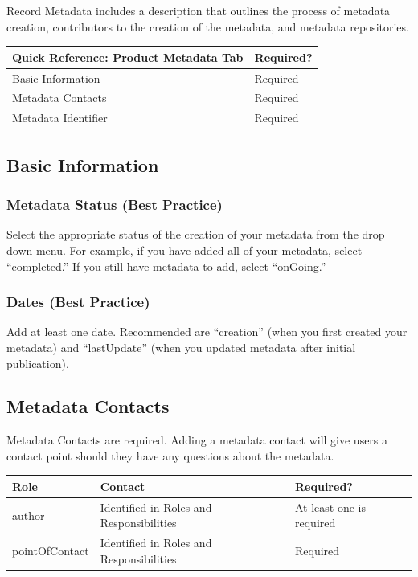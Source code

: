\documentclass[
]{book}
\begin{document}
Record Metadata includes a description that outlines the process of metadata creation, contributors to the creation of the metadata, and metadata repositories.

\begin{longtable}[]{@{}ll@{}}
\toprule
Quick Reference: Product Metadata Tab & Required?\tabularnewline
\midrule
\endhead
Basic Information & Required\tabularnewline
Metadata Contacts & Required\tabularnewline
Metadata Identifier & Required\tabularnewline
\bottomrule
\end{longtable}

\hypertarget{basic-information-3}{%
\subsection{Basic Information}\label{basic-information-3}}

\hypertarget{metadata-status-best-practice-1}{%
\subsubsection{Metadata Status (Best Practice)}\label{metadata-status-best-practice-1}}

Select the appropriate status of the creation of your metadata from the drop down menu. For example, if you have added all of your metadata, select ``completed.'' If you still have metadata to add, select ``onGoing.''

\hypertarget{dates-best-practice-2}{%
\subsubsection{Dates (Best Practice)}\label{dates-best-practice-2}}

Add at least one date. Recommended are ``creation'' (when you first created your metadata) and ``lastUpdate'' (when you updated metadata after initial publication).

\hypertarget{metadata-contacts-1}{%
\subsection{Metadata Contacts}\label{metadata-contacts-1}}

Metadata Contacts are required. Adding a metadata contact will give users a contact point should they have any questions about the metadata.

\begin{longtable}[]{@{}lll@{}}
\toprule
Role & Contact & Required?\tabularnewline
\midrule
\endhead
author & Identified in Roles and Responsibilities & At least one is required\tabularnewline
pointOfContact & Identified in Roles and Responsibilities & Required\tabularnewline
\bottomrule
\end{longtable}
\end{document}
